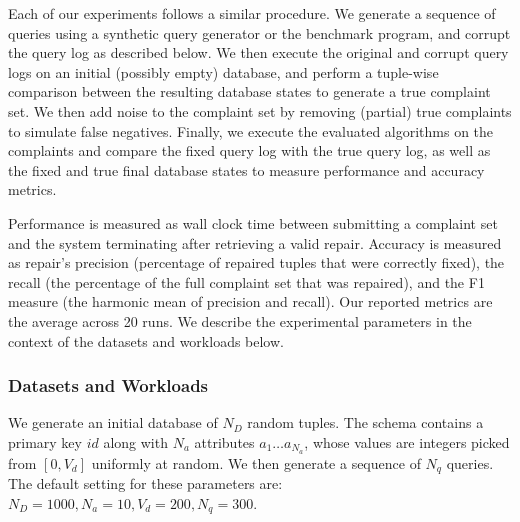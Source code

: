 Each of our experiments follows a similar procedure. 
We generate a sequence of queries using a synthetic query generator or 
the benchmark program, and corrupt the query log as described below. 
We then execute the original and corrupt query logs on an initial (possibly empty) database,
and perform a tuple-wise comparison between the resulting database states 
to generate a true complaint set.  
We then add noise to the complaint set by removing (partial) true complaints to simulate false negatives.
Finally, we execute the evaluated algorithms on the complaints and compare the fixed
query log with the true query log, as well as the fixed and true
final database states to measure performance and accuracy metrics.

Performance is measured as wall clock
time between submitting a complaint set and the system terminating after retrieving a valid repair.  
Accuracy is measured as repair's precision (percentage of repaired tuples that were correctly fixed), 
the recall (the percentage of the full complaint set that was repaired), 
and the F1 measure (the harmonic mean of precision and recall).
Our reported metrics are the average across 20 runs.
We describe the experimental parameters in the context of the datasets and workloads below.


\subsubsection{Datasets and Workloads}



 \label{sec:syntheticgen}
We generate an initial database of $N_D$ random tuples.  
The schema contains a primary key $id$ along with $N_a$ attributes $a_1\ldots a_{N_a}$, whose values are integers picked from $[0, V_d]$ uniformly at random.
We then generate a sequence of $N_q$ queries.
The default setting for these parameters are: $N_D = 1000, N_a = 10, V_d = 200, N_q = 300$.


